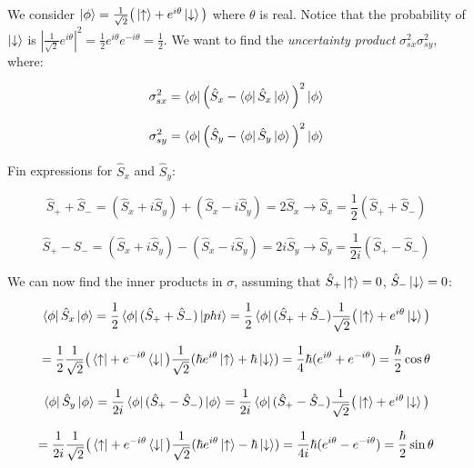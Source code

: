 \documentclass[11pt]{article}
\begin{document}
\begin{flushleft}
We consider $\ket{\phi} = \frac{1}{\sqrt{2}} \big( 
\ket{\uparrow} + e^{i \theta} \ket{\downarrow}
\big)$ where $\theta$ is real. Notice that the probability of $\ket{\downarrow}$ is $|\frac{1}{\sqrt{2}} e^{i\theta}|^2 = \frac{1}{2} e^{i \theta} e^{-i \theta} = \frac{1}{2}$. We want to find the \textit{uncertainty product} $\sigma_{sx}^2 \sigma_{sy}^2$, where:

\begin{equation}
\sigma_{sx}^2 = \bra{\phi} \Big( 
\hat{S}_x - \bra{\phi}\hat{S}_x \ket{\phi}
\Big)^2
\ket{\phi} 
\end{equation}

\begin{equation}
\sigma_{sy}^2 = \bra{\phi} \Big( 
\hat{S}_y - \bra{\phi}\hat{S}_y \ket{\phi}
\Big)^2
\ket{\phi}
\end{equation}

Fin expressions for $\hat{S}_x$ and $\hat{S}_y$:

$$
\hat{S}_+ + \hat{S}_- = (\hat{S}_x + i \hat{S}_y) + (\hat{S}_x - i \hat{S}_y) = 2 \hat{S}_x \rightarrow \hat{S}_x = \frac{1}{2} (\hat{S}_+ + \hat{S}_-)
$$

$$
\hat{S}_+ - \hat{S}_- = (\hat{S}_x + i \hat{S}_y) - (\hat{S}_x - i \hat{S}_y) = 2 i\hat{S}_y \rightarrow \hat{S}_y = \frac{1}{2i} (\hat{S}_+ - \hat{S}_-)
$$

We can now find the inner products in $\sigma$, assuming that $\hat{S}_+ \ket{\uparrow} = 0$, $\hat{S}_- \ket{\downarrow} = 0$:

$$
\bra{\phi} \hat{S}_x \ket{\phi} = \frac{1}{2} \bra{\phi} (\hat{S}_+ + \hat{S}_-) \ket{phi} = \frac{1}{2} \bra{\phi} (\hat{S}_+ + \hat{S}_-) 
\frac{1}{\sqrt{2}} \big( 
\ket{\uparrow} + e^{i \theta} \ket{\downarrow}
\big)
$$

$$
= \frac{1}{2} \frac{1}{\sqrt{2}} \big( 
\bra{\uparrow} + e^{-i \theta} \bra{\downarrow}
\big) 
\frac{1}{\sqrt{2}}
(\hbar e^{i \theta} \ket{\uparrow} + \hbar \ket{\downarrow})
= \frac{1}{4} \hbar (e^{i \theta} + e^{-i \theta}) = \frac{\hbar
}{2} \cos \theta
$$

$$
\bra{\phi} \hat{S}_y \ket{\phi} 
= \frac{1}{2i} \bra{\phi} (\hat{S}_+ - \hat{S}_-) \ket{\phi} 
= \frac{1}{2i} \bra{\phi} (\hat{S}_+ - \hat{S}_-) 
\frac{1}{\sqrt{2}} \big( 
\ket{\uparrow} + e^{i \theta} \ket{\downarrow}
\big)
$$

$$
= \frac{1}{2i} \frac{1}{\sqrt{2}} \big( 
\bra{\uparrow} + e^{-i \theta} \bra{\downarrow}
\big) 
\frac{1}{\sqrt{2}}
(\hbar e^{i \theta} \ket{\uparrow} - \hbar \ket{\downarrow})
= \frac{1}{4i} \hbar (e^{i \theta} - e^{-i \theta}) = \frac{\hbar
}{2} \sin \theta
$$


\end{flushleft}
\end{document}
